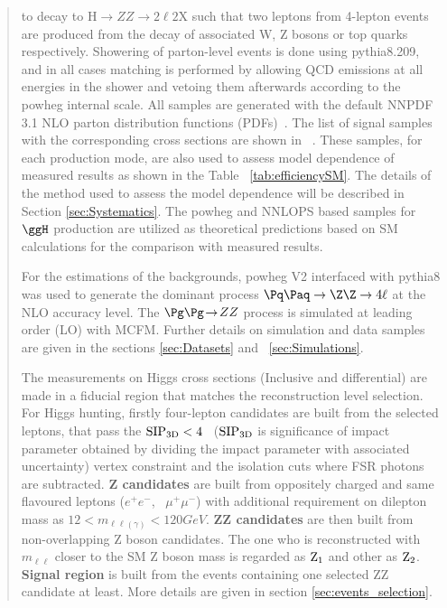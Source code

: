 \begin{abstract}
to decay to H$\to ZZ \to 2\ell2$X such that two leptons from 4-lepton events are produced from 
the decay of associated W, Z bosons or top quarks respectively. 
Showering of parton-level events is done using {\sc pythia8.209}, and in all cases matching is performed by  
allowing QCD emissions at all energies in the shower and vetoing them afterwards according to the 
{\sc powheg} internal scale. All samples are generated with the default NNPDF 3.1 NLO parton distribution 
functions (PDFs)~\cite{Ball:2014uwa}. The list of signal samples with the corresponding cross sections are shown in ~\cite{CMS:2019chr}.
These samples, for each production mode, are also used to assess model dependence of measured results as shown in the Table ~\ref{tab:efficiencySM}. The details of the method used to assess the model dependence will be 
described in Section \ref{sec:Systematics}.
The {\sc powheg} and {\sc NNLOPS} based samples for $\ggH$ production are utilized as theoretical predictions based on SM calculations for the comparison with measured results.\\
\par For the estimations of the backgrounds, {\sc powheg V2} interfaced with {\sc pythia8} was used to generate the dominant process $\Pq\Paq \to \Z \Z \to 4\ell$  at the NLO accuracy level. The $\Pg\Pg \! \to \! ZZ$ process is simulated at leading order (LO) with {\sc MCFM}. Further details on simulation and data samples are given in the sections \ref{sec:Datasets} and ~\ref{sec:Simulations}.
\par The measurements on Higgs cross sections (Inclusive and differential) are made in a fiducial region that matches the reconstruction level selection.
For Higgs hunting, firstly four-lepton candidates are built from the selected leptons, that pass the ${\rm SIP_{3D}} < 4$~ (${\rm SIP_{3D}}$ is significance of impact parameter obtained by dividing the impact parameter with associated uncertainty) vertex constraint and the isolation cuts where FSR photons are subtracted. {\bf Z candidates} are built from oppositely charged and same flavoured leptons ($e^+ e^-$, \, $\mu^+\mu^-$) with additional requirement on dilepton mass as $12 < m_{\ell\ell(\gamma)} < 120 GeV$. {\bf ZZ candidates} are then built from non-overlapping Z boson candidates. The one who is reconstructed with $m_{\ell\ell}$ closer to the SM Z boson mass is regarded as ${\rm Z_1}$ and other as ${\rm Z_2}$. {\bf Signal region} is built from the events containing one selected ZZ candidate at least. More details are given in section \ref{sec:events_selection}.



\end{abstract}
